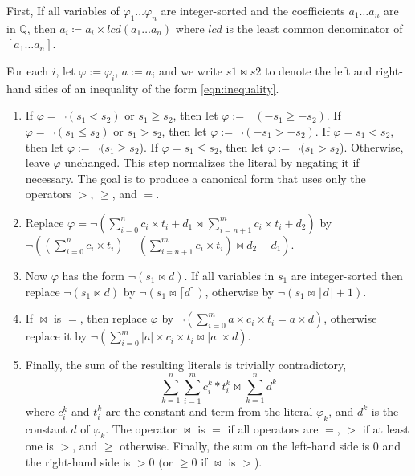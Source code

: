 First, If all variables of $\varphi_1 \dots \varphi_n$ are integer-sorted and the coefficients $a_1 \dots a_n$ are in $\mathbb{Q}$,
then $a_i \coloneq a_i \times \mathit{lcd}(a_1 \dots a_n)$ where $\mathit{lcd}$ is the least common denominator of $[a_1 \dots a_n]$.

For each $i$, let $\varphi := \varphi_i$, $a := a_i$ and
we write $s1 \bowtie s2$ to denote the left and right-hand sides of an inequality of the form \eqref{eqn:inequality}.


\begin{enumerate}
    \item If $\varphi =  \neg (s_1 < s_2)$  or $s_1 \geq s_2$, then let $\varphi := \neg(- s_1 \geq - s_2)$.
    If $\varphi =  \neg (s_1 \leq s_2)$ or $s_1 > s_2$, then let $\varphi := \neg(- s_1 > - s_2)$.
    If $\varphi = s_1 < s_2$, then let $\varphi := \neg(s_1 \geq s_2$).
    If $\varphi = s_1 \leq s_2$, then let $\varphi := \neg(s_1 > s_2$).
    Otherwise, leave $\varphi$ unchanged.
    This step normalizes the literal by negating it if necessary.
    The goal is to produce a canonical form that uses only the operators $>$, $\geq$, and $=$.\\


    \item Replace $\varphi = \neg (\sum_{i=0}^{n}c_i\times{}t_i + d_1 \bowtie \sum_{i=n+1}^{m} c_i\times{}t_i + d_2)$ by $\neg (\left(\sum_{i=0}^{n}c_i\times{}t_i\right) - \left(\sum_{i=n+1}^{m} c_i\times{}t_i\right)
    \bowtie d_2 - d_1)$.

    \item \label{la_generic:str}Now $\varphi$ has the form $\neg (s_1 \bowtie d)$. If all
    variables in $s_1$ are integer-sorted then replace $\neg (s_1 \bowtie d)$ by $\neg (s_1 \bowtie \lceil d \rceil)$,
    otherwise by $\neg (s_1 \bowtie \lfloor d\rfloor + 1)$.

    \item If $\bowtie$ is $=$, then replace $\varphi$ by
    $\neg (\sum_{i=0}^{m}a\times{}c_i\times{}t_i = a\times{}d)$, otherwise replace it by
    $\neg (\sum_{i=0}^{m}|a|\times{}c_i\times{}t_i \bowtie |a|\times{}d)$.

    \item Finally, the sum of the resulting literals is trivially contradictory,
    \[
        \sum_{k=1}^{n}\sum_{i=1}^{m}c_i^k*t_i^k \bowtie \sum_{k=1}^{n}d^k
    \]
  where $c_i^k$ and $t_i^k$ are the constant and term from the literal $\varphi_k$, and $d^k$ is the constant $d$ of $\varphi_k$.
  The operator $\bowtie$ is $=$ if all operators are $=$, $>$ if at least one is $>$, and $\geq$ otherwise.
  Finally, the sum on the left-hand side is $0$ and the right-hand side is $>0$ (or $\geq 0$ if $\bowtie$ is $>$).

\end{enumerate}

